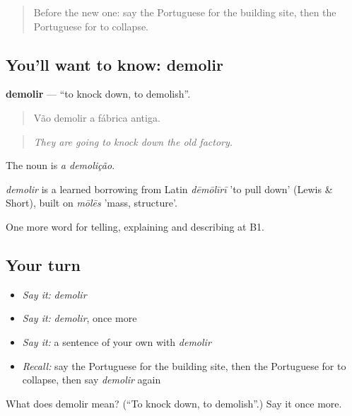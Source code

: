 \label{lesson:PT-C445-demolir}



\begin{quote}
Before the new one: say the Portuguese for the building site, then the Portuguese for to collapse.
\end{quote}

\subsection*{You'll want to know: demolir}
\textbf{demolir} — \textquotedblleft{}to knock down, to demolish\textquotedblright{}.

\begin{quote}
Vão demolir a fábrica antiga.
\end{quote}

\begin{quote}
\emph{They are going to knock down the old factory.}
\end{quote}

The noun is \emph{a demolição}.

\begin{cousinweb}
\emph{demolir} is a learned borrowing from Latin \emph{dēmōlīrī} 'to pull down' (Lewis \& Short), built on \emph{mōlēs} 'mass, structure'.
\end{cousinweb}

\begin{grammarlens}[title={What you've built}]
One more word for telling, explaining and describing at B1.
\end{grammarlens}

\subsection*{Your turn}
\begin{itemize}
\raggedright
  \item \emph{Say it:} \emph{demolir}
  \item \emph{Say it:} \emph{demolir}, once more
  \item \emph{Say it:} a sentence of your own with \emph{demolir}
  \item \emph{Recall:} say the Portuguese for the building site, then the Portuguese for to collapse, then say \emph{demolir} again
\end{itemize}

\begin{tcolorbox}[breakable,colback=teal!4,colframe=teal!35!black,title={Before you move on}]
What does demolir mean? (\textquotedblleft{}To knock down, to demolish\textquotedblright{}.) Say it once more.
\end{tcolorbox}
